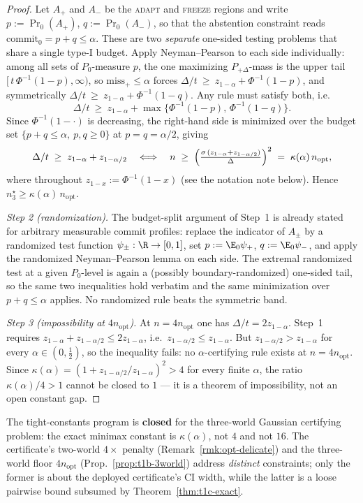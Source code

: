 \begin{proof}
Let $A_+$ and $A_-$ be the \textsc{adapt} and \textsc{freeze} regions and write
$p:=\Pr_0(A_+)$, $q:=\Pr_0(A_-)$, so that the abstention constraint reads
$\mathrm{commit}_0=p+q\le\alpha$.  These are two \emph{separate} one-sided testing problems that
share a single type-I budget.  Apply Neyman--Pearson to each side individually: among all sets of
$P_0$-measure $p$, the one maximizing $P_{+\Delta}$-mass is the upper tail
$[\,t\,\Phi^{-1}(1-p),\infty)$, so
$\mathrm{miss}_+\le\alpha$ forces
$\Delta/t\ \ge\ z_{1-\alpha}+\Phi^{-1}(1-p)$, and symmetrically
$\Delta/t\ \ge\ z_{1-\alpha}+\Phi^{-1}(1-q)$.
Any rule must satisfy both, i.e.\
\[
  \Delta/t\ \ge\ z_{1-\alpha}+\max\{\Phi^{-1}(1-p),\,\Phi^{-1}(1-q)\}.
\]
Since $\Phi^{-1}(1-\cdot)$ is decreasing, the right-hand side is minimized over the budget set
$\{p+q\le\alpha,\ p,q\ge0\}$ at $p=q=\alpha/2$, giving
\[
  \Delta/t\;\ge\;z_{1-\alpha}+z_{1-\alpha/2}
  \quad\Longleftrightarrow\quad
  n\;\ge\;\Bigl(\tfrac{\sigma\,(z_{1-\alpha}+z_{1-\alpha/2})}{\Delta}\Bigr)^2
  \;=\;\kappa(\alpha)\,n_{\mathrm{opt}},
\]
where throughout $z_{1-x}:=\Phi^{-1}(1-x)$ (see the notation note below).
Hence $n^\star_{3}\ge\kappa(\alpha)\,n_{\mathrm{opt}}$.

\emph{Step 2 (randomization).}  The budget-split argument of Step~1 is already stated for
arbitrary measurable commit profiles: replace the indicator of $A_\pm$ by a randomized test
function $\psi_\pm:\R\to[0,1]$, set $p:=\E_0\psi_+$, $q:=\E_0\psi_-$, and apply the randomized
Neyman--Pearson lemma on each side.  The extremal randomized test at a given $P_0$-level is again
a (possibly boundary-randomized) one-sided tail, so the same two inequalities hold verbatim and
the same minimization over $p+q\le\alpha$ applies.  No randomized rule beats the symmetric band.

\emph{Step 3 (impossibility at $4n_{\mathrm{opt}}$).}  At $n=4n_{\mathrm{opt}}$ one has
$\Delta/t=2z_{1-\alpha}$.  Step~1 requires $z_{1-\alpha}+z_{1-\alpha/2}\le2z_{1-\alpha}$, i.e.\
$z_{1-\alpha/2}\le z_{1-\alpha}$.  But $z_{1-\alpha/2}>z_{1-\alpha}$ for every $\alpha\in(0,\tfrac12)$,
so the inequality fails: no $\alpha$-certifying rule exists at $n=4n_{\mathrm{opt}}$.  Since
$\kappa(\alpha)=(1+z_{1-\alpha/2}/z_{1-\alpha})^2>4$ for every finite $\alpha$, the ratio
$\kappa(\alpha)/4>1$ cannot be closed to $1$ --- it is a theorem of impossibility, not an open
constant gap.
\end{proof}

\begin{corollary}\label{cor:t1c-status}
The tight-constants program is \textbf{closed} for the three-world Gaussian certifying problem:
the exact minimax constant is $\kappa(\alpha)$, not $4$ and not $16$.  The certificate's
two-world $4\times$ penalty (Remark~\ref{rmk:opt-delicate}) and the three-world floor
$4n_{\mathrm{opt}}$ (Prop.~\ref{prop:t1b-3world}) address \emph{distinct} constraints; only the
former is about the deployed certificate's CI width, while the latter is a loose pairwise bound
subsumed by Theorem~\ref{thm:t1c-exact}.
\end{corollary}

